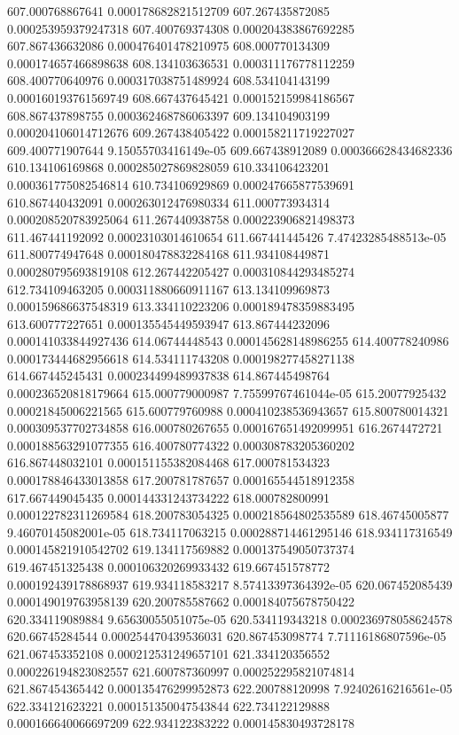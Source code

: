 {607.000768867641 0.000178682821512709
607.267435872085 0.000253959379247318
607.400769374308 0.000204383867692285
607.867436632086 0.000476401478210975
608.000770134309 0.000174657466898638
608.134103636531 0.000311176778112259
608.400770640976 0.000317038751489924
608.534104143199 0.000160193761569749
608.667437645421 0.000152159984186567
608.867437898755 0.000362468786063397
609.134104903199 0.000204106014712676
609.267438405422 0.000158211719227027
609.400771907644 9.15055703416149e-05
609.667438912089 0.000366628434682336
610.134106169868 0.000285027869828059
610.334106423201 0.000361775082546814
610.734106929869 0.000247665877539691
610.867440432091 0.000263012476980334
611.000773934314 0.000208520783925064
611.267440938758 0.000223906821498373
611.467441192092 0.00023103014610654
611.667441445426 7.47423285488513e-05
611.800774947648 0.000180478832284168
611.934108449871 0.000280795693819108
612.267442205427 0.000310844293485274
612.734109463205 0.000311880660911167
613.134109969873 0.000159686637548319
613.334110223206 0.000189478359883495
613.600777227651 0.000135545449593947
613.867444232096 0.000141033844927436
614.06744448543 0.000145628148986255
614.400778240986 0.000173444682956618
614.534111743208 0.000198277458271138
614.667445245431 0.000234499489937838
614.867445498764 0.000236520818179664
615.000779000987 7.75599767461044e-05
615.20077925432 0.00021845006221565
615.600779760988 0.000410238536943657
615.800780014321 0.000309537702734858
616.000780267655 0.000167651492099951
616.2674472721 0.000188563291077355
616.400780774322 0.000308783205360202
616.867448032101 0.000151155382084468
617.000781534323 0.000178846433013858
617.200781787657 0.000165544518912358
617.667449045435 0.000144331243734222
618.000782800991 0.000122782311269584
618.200783054325 0.000218564802535589
618.46745005877 9.46070145082001e-05
618.734117063215 0.000288714461295146
618.934117316549 0.000145821910542702
619.134117569882 0.000137549050737374
619.467451325438 0.000106320269933432
619.667451578772 0.000192439178868937
619.934118583217 8.57413397364392e-05
620.067452085439 0.000149019763958139
620.200785587662 0.000184075678750422
620.334119089884 9.65630055051075e-05
620.534119343218 0.000236978058624578
620.66745284544 0.000254470439536031
620.867453098774 7.71116186807596e-05
621.067453352108 0.000212531249657101
621.334120356552 0.000226194823082557
621.600787360997 0.000252295821074814
621.867454365442 0.000135476299952873
622.200788120998 7.92402616216561e-05
622.334121623221 0.000151350047543844
622.734122129888 0.000166640066697209
622.934122383222 0.000145830493728178
}
